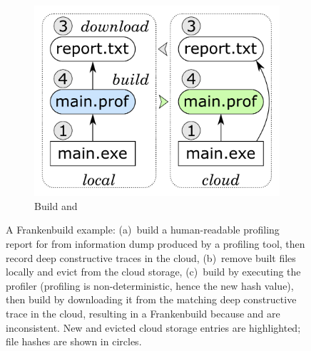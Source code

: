\begin{figure}
\begin{subfigure}[b]{0.31\linewidth}
\end{subfigure}
\begin{subfigure}[b]{0.36\linewidth}
\centerline{\includegraphics[scale=0.26]{fig/frankenbuild-example-rebuild.pdf}}
\caption{Build  and }
\end{subfigure}
\caption{A Frankenbuild example: (a)~build a human-readable profiling report for
 from information dump  produced by a profiling
tool, then record deep constructive traces in the cloud, (b)~remove built files
locally and evict  from the cloud storage, (c)~build
 by executing the profiler (profiling is non-deterministic, hence
the new hash value), then build  by downloading it from the
matching deep constructive trace in the cloud, resulting in a Frankenbuild
because  and  are inconsistent. New and evicted
cloud storage entries are highlighted; file hashes are shown in circles.
\label{fig-frankenbuild}}
\end{figure}

